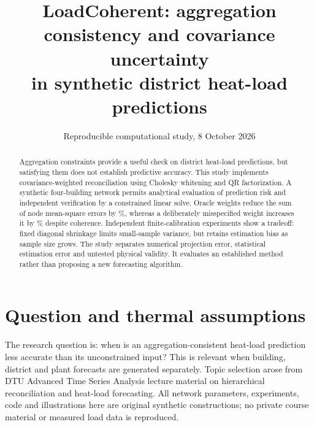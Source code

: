 \documentclass[10pt,a4paper]{article}
\title{LoadCoherent: aggregation consistency and covariance uncertainty\\
in synthetic district heat-load predictions}
\author{}
\date{Reproducible computational study, 8 October 2026}
\begin{document}
\maketitle
\vspace{-2em}
\begin{abstract}
Aggregation constraints provide a useful check on district heat-load predictions,
but satisfying them does not establish predictive accuracy. This study implements
covariance-weighted reconciliation using Cholesky whitening and QR factorization.
A synthetic four-building network permits analytical evaluation of prediction
risk and independent verification by a constrained linear solve. Oracle weights
reduce the sum of node mean-square errors by \OracleReduction\%, whereas a
deliberately misspecified weight increases it by \WrongIncrease\% despite
coherence. Independent finite-calibration experiments show a tradeoff: fixed
diagonal shrinkage limits small-sample variance, but retains estimation bias as
sample size grows. The study separates numerical projection error, statistical
estimation error and untested physical validity. It evaluates an established
method rather than proposing a new forecasting algorithm.
\end{abstract}

\section{Question and thermal assumptions}
The research question is: when is an aggregation-consistent heat-load prediction
less accurate than its unconstrained input? This is relevant when building,
district and plant forecasts are generated separately. Topic selection arose
from DTU Advanced Time Series Analysis lecture material on hierarchical
reconciliation and heat-load forecasting. All network parameters, experiments,
code and illustrations here are original synthetic constructions; no private
course material or measured load data is reproduced.
\end{document}
